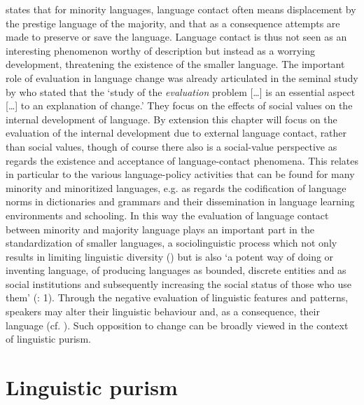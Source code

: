 \documentclass[output=paper]{langsci/langscibook}
\begin{document}
\citet{Laabs2009} states that for minority languages, language contact often means displacement by the prestige language of the majority, and that as a consequence attempts are made to preserve or save the language. Language contact is thus not seen as an interesting phenomenon worthy of description but instead as a worrying development, threatening the existence of the smaller language. The important role of evaluation in language change was already articulated in the seminal study by \citet[165]{WeinreichEtAl1968} who stated that the ‘study of the \textit{evaluation} problem […] is an essential aspect […] to an explanation of change.’ They focus on the effects of social values on the internal development of language. By extension this chapter will focus on the evaluation of the internal development due to external language contact, rather than social values, though of course there also is a social-value perspective as regards the existence and acceptance of language-contact phenomena. This relates in particular to the various language-policy activities that can be found for many minority and minoritized languages, e.g. as regards the codification of language norms in dictionaries and grammars and their dissemination in language learning environments and schooling. In this way the evaluation of language contact between minority and majority language plays an important part in the standardization of smaller languages, a sociolinguistic process which not only results in limiting linguistic diversity (\citealt{MilroyMilroy1999}) but is also ‘a potent way of doing or inventing language, of producing languages as bounded, discrete entities and as social institutions and subsequently increasing the social status of those who use them’ (\citealt{CostaEtAl2018}: 1). Through the negative evaluation of linguistic features and patterns, speakers may alter their linguistic behaviour and, as a consequence, their language (cf. \citealt{DaviesLanger2006}). Such opposition to change can be broadly viewed in the context of linguistic purism.

\section{Linguistic purism}
\label{sec:gregersen:2}
\end{document}
